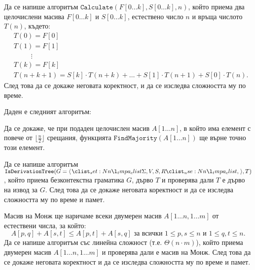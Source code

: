 \begin{problem}
Да се напише алгоритъм $\mathtt{Calculate}(F[0 \dots k], S[0 \dots k], n)$, който приема два целочислени масива $F[0 \dots k]$ и $S[0 \dots k]$, естествено число $n$ и връща числото $T(n)$, където:
\begin{align*}
     & T(0) = F[0]                                                                         \\
     & T(1) = F[1]                                                                         \\
     & \phantom{00000} \vdots                                                              \\
     & T(k) = F[k]                                                                         \\
     & T(n + k + 1) = S[k] \cdot T(n + k) + \dots + S[1] \cdot T(n + 1) + S[0] \cdot T(n).
\end{align*}
След това да се докаже неговата коректност, и да се изследва сложността му по време.
\end{problem}

\newpage

\begin{problem}
Даден е следният алгоритъм:


Да се докаже, че при подаден целочислен масив $A[1 \dots n]$, в който има елемент с повече от $\lfloor \frac{n}{2} \rfloor$ срещания,
функцията $\mathtt{FindMajority}(A[1 \dots n])$ ще върне точно този елемент.
\end{problem}

\begin{problem}
Да се напише алгоритъм $\mathtt{IsDerivationTree}(G = \opair{\Sigma, V, S, R}, T)$, който приема безконтекстна граматика $G$, дърво $T$ и проверява дали $T$ е дърво на извод за $G$.
След това да се докаже неговата коректност и да се изследва сложността му по време и памет.
\end{problem}

\begin{problem}
Масив на Монж ще наричаме всеки двумерен масив $A[1 \dots n, 1 \dots m]$ от естествени числа, за който:
\[
    A[p, q] + A[s, t] \leq A[p, t] + A[s, q] \text{ за всички } 1 \leq p, s \leq n \text{ и } 1 \leq q, t \leq n.
\]
Да се напише алгоритъм със линейна сложност (т.е. $\Theta(n \cdot m)$), който приема двумерен масив $A[1 \dots n, 1 \dots m]$ и проверява дали е масив на Монж.
След това да се докаже неговата коректност и да се изследва сложността му по време и памет.
\end{problem}

